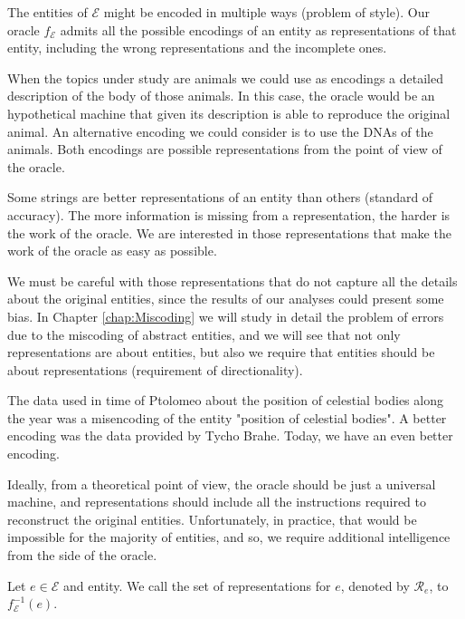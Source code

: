 The entities of $\mathcal{E}$ might be encoded in multiple ways (problem of style). Our oracle $f_\mathcal{E}$ admits all the possible encodings of an entity as representations of that entity, including the wrong representations and the incomplete ones.

\begin{example}
When the topics under study are animals we could use as encodings a detailed description of the body of those animals. In this case, the oracle would be an hypothetical machine that given its description is able to reproduce the original animal. An alternative encoding we could consider is to use the DNAs of the animals. Both encodings are possible representations from the point of view of the oracle.
\end{example}

Some strings are better representations of an entity than others (standard of accuracy). The more information is missing from a representation, the harder is the work of the oracle. We are interested in those representations that make the work of the oracle as easy as possible.

We must be careful with those representations that do not capture all the details about the original entities, since the results of our analyses could present some bias. In Chapter \ref{chap:Miscoding} we will study in detail the problem of errors due to the miscoding of abstract entities, and we will see that not only representations are about entities, but also we require that entities should be about representations (requirement of directionality).

\begin{example}
The data used in time of Ptolomeo about the position of celestial bodies along the year was a misencoding of the entity "position of celestial bodies". A better encoding was the data provided by Tycho Brahe. Today, we have an even better encoding.
\end{example}

Ideally, from a theoretical point of view, the oracle should be just a universal machine, and representations should include all the instructions required to reconstruct the original entities. Unfortunately, in practice, that would be impossible for the majority of entities, and so, we require additional intelligence from the side of the oracle.

\begin{definition}
\label{def:descriptions_topic}
Let $e \in \mathcal{E}$ and entity. We call the set of representations for $e$, denoted by $\mathcal{R}_e$, to $f_\mathcal{E}^{-1}(e)$.
\end{definition}

